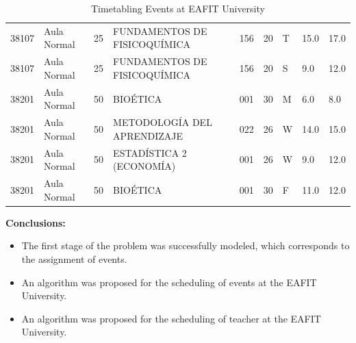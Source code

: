 \documentclass[centering]{report}
\newenvironment{slide}
    {\newpage
    \vspace*{\fill}
    }
    { 
     \vspace*{\fill}
    }
\begin{document}
\begin{slide}
\begin{table}[h!]
{\begin{tabular}{| l | l | l | l | l | l | l | l | l |}
    \color{black}38107 & \color{black}Aula Normal & \color{black}25 & \color{black}FUNDAMENTOS DE FISICOQUÍMICA & \color{black}156 & \color{black}20 & \color{black}T  & \color{black}15.0 & \color{black}17.0 \\
    \color{black}38107 & \color{black}Aula Normal & \color{black}25 & \color{black}FUNDAMENTOS DE FISICOQUÍMICA & \color{black}156 & \color{black}20 & \color{black}S  & \color{black}9.0 & \color{black}12.0 \\
    \color{black}38201 & \color{black}Aula Normal & \color{black}50 & \color{black}BIOÉTICA & \color{black}001 & \color{black}30 & \color{black}M  & \color{black}6.0 & \color{black}8.0 \\
    \color{black}38201 & \color{black}Aula Normal & \color{black}50 & \color{black}METODOLOGÍA DEL APRENDIZAJE & \color{black}022 & \color{black}26 & \color{black}W  & \color{black}14.0 & \color{black}15.0 \\
    \color{black}38201 & \color{black}Aula Normal & \color{black}50 & \color{black}ESTADÍSTICA 2 (ECONOMÍA) & \color{black}001 & \color{black}26 & \color{black}W  & \color{black}9.0 & \color{black}12.0 \\
    \color{black}38201 & \color{black}Aula Normal & \color{black}50 & \color{black}BIOÉTICA & \color{black}001 & \color{black}30 & \color{black}F  & \color{black}11.0 & \color{black}12.0 \\


    \hline
  \end{tabular}%
  }
  \label{Table:result}
  \caption{Timetabling Events at EAFIT University}
\end{table}
\end{slide}

\begin{slide}
\textbf{Conclusions:}\\

\begin{itemize}
\item The first stage of the problem was successfully modeled, which corresponds to the assignment of events.
\item An algorithm was proposed for the scheduling of events
at the EAFIT University.
\item An algorithm was proposed for the scheduling of teacher
at the EAFIT University.
\end{itemize}
\end{slide}

\end{document}

